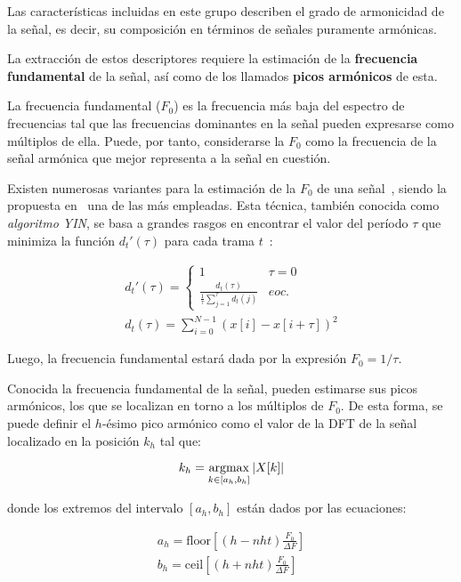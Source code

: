 Las características incluidas en este grupo describen el grado de armonicidad de la señal, es decir, su composición en términos de señales puramente armónicas.

La extracción de estos descriptores requiere la estimación de la \textbf{frecuencia fundamental} de la señal, así como de los llamados \textbf{picos armónicos} de esta.

La frecuencia fundamental ($F_0$) es la frecuencia más baja del espectro de frecuencias tal que las frecuencias dominantes en la señal pueden expresarse como múltiplos de ella.
Puede, por tanto, considerarse la $F_0$ como la frecuencia de la señal armónica que mejor representa a la señal en cuestión.

Existen numerosas variantes para la estimación de la $F_0$ de una señal~\cite{Kim05}, siendo la propuesta en~\cite{Cheveigne02} una de las más empleadas.
Esta técnica, también conocida como \textit{algoritmo YIN}, se basa a grandes rasgos en encontrar el valor del período $\tau$ que minimiza la función $d_t'(\tau)$ para cada trama $t$~\cite{Gerhard03-2}:

\begin{gather}
    \label{eq:YIN}
    d_t'(\tau) = \begin{cases}
                     1 & \tau = 0 \\
                     \frac{d_t(\tau)}{\frac{1}{\tau}{\sum_{j=1}^{\tau}{d_t(j)}}} & eoc.
    \end{cases}\\
    d_t(\tau) = \sum_{i=0}^{N-1}{(x[i]-x[i+\tau])^2}
\end{gather}

Luego, la frecuencia fundamental estará dada por la expresión $F_0 = 1/\tau$.

Conocida la frecuencia fundamental de la señal, pueden estimarse sus picos armónicos, los que se localizan en torno a los múltiplos de $F_0$.
De esta forma, se puede definir el $h$-ésimo pico armónico como el valor de la DFT de la señal localizado en la posición $k_h$ tal que:

\begin{equation}
    \label{eq:harmonicPeaks}
    k_h = \operatorname*{argmax}_{k\in [a_h,b_h]}|X[k]|
\end{equation}

\noindent
donde los extremos del intervalo $[a_h, b_h]$ están dados por las ecuaciones:

\begin{gather*}
    a_h = \text{floor}\left[ (h - nht)\frac{F_0}{\Delta F} \right] \\
    b_h = \text{ceil}\left[ (h + nht)\frac{F_0}{\Delta F} \right]
\end{gather*}

